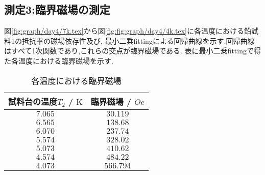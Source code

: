 \subsection{測定3:臨界磁場の測定}
図\ref{fig:graph/day4/7k.tex}から図\ref{fig:fig:graph/day4/4k.tex}に各温度における鉛試料1の抵抗率の磁場依存性及び,
最小二乗fittingによる回帰曲線を示す.回帰曲線はすべて1次関数であり,これらの交点が臨界磁場である.
表に最小二乗fittingで得た各温度における臨界磁場を示す.
\begin{table}[h]
\caption{各温度における臨界磁場}
\label{tab:rinkaijiba}
\centering
\begin{tabular}{cc}
\hline
試料台の温度$T_2$ / $\si{\kelvin}$&臨界磁場 / $\si{Oe}$\\
\hline \hline
$7.065$&$30.119$\\
$6.565$&$138.68$\\
$6.070$&$237.74$\\
$5.574$&$328.02$\\
$5.073$&$410.62$\\
$4.574$&$484.22$\\
$4.073$&$566.794$\\
\hline
\end{tabular}
\end{table}
